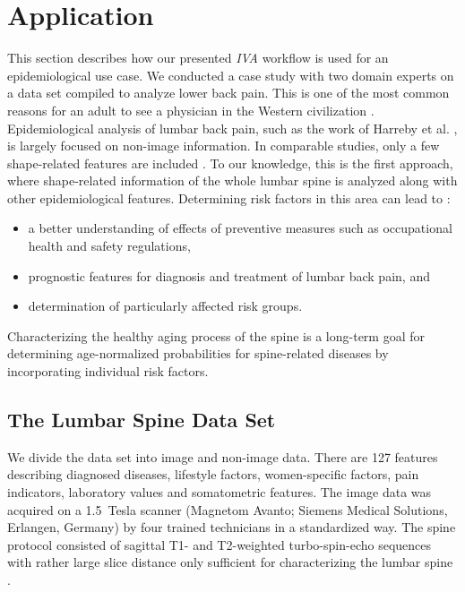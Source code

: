 \documentclass[journal]{style/vgtc} 			          %
\begin{document}
\section{Application}
This section describes how our presented \emph{IVA} workflow is used for an epidemiological use case.
%
We conducted a case study with two domain experts on a data set compiled to analyze lower back pain. 
%
This is one of the most common reasons for an adult to see a physician in the Western civilization \cite{Backpain}.
%
Epidemiological analysis of lumbar back pain, such as the work of Harreby et al. \cite{Harreby1996}, is largely focused on non-image information.
%
In comparable studies, only a few shape-related features are included \cite{Lang2011}.
%
To our knowledge, this is the first approach, where shape-related information of the whole lumbar spine is analyzed along with other epidemiological features.
%
Determining risk factors in this area can lead to \cite{Fletcher2012}:
\begin{itemize}
	\item a better understanding of effects of preventive measures such as occupational health and safety regulations,
	\item prognostic features for diagnosis and treatment of lumbar back pain, and
	\item determination of particularly affected risk groups.
\end{itemize}
%
Characterizing the healthy aging process of the spine is a long-term goal for determining age-normalized probabilities for spine-related diseases by incorporating individual risk factors.
%
\subsection{The Lumbar Spine Data Set}
We divide the data set into image and non-image data.
%
There are 127 features describing diagnosed diseases, lifestyle factors, women-specific factors, pain indicators, laboratory values and somatometric features.
%
The image data was acquired on a 1.5~Tesla scanner (Magnetom Avanto; Siemens Medical Solutions, Erlangen, Germany) by four trained technicians in a standardized way.
%
The spine protocol consisted of sagittal T1- and T2-weighted turbo-spin-echo sequences with rather large slice distance only sufficient for characterizing the lumbar spine \cite{Hegenscheid2013}.
\end{document}
